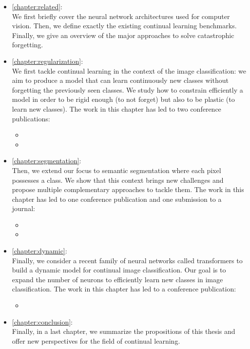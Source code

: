 \begin{itemize}
      \item \autoref{chapter:related}: \\
            We first briefly cover the neural network architectures used for computer vision. Then,
            we define exactly the existing continual learning benchmarks. Finally, we give an
            overview of the major approaches to solve catastrophic forgetting.

      \item \autoref{chapter:regularization}: \\
            We first tackle continual learning in the context of the image classification: we aim to
            produce a model that can learn continuously new classes without forgetting the
            previously seen classes. We study how to constrain efficiently a model in order to be
            rigid enough (to not forget) but also to be plastic (to learn new classes). The work in
            this chapter has led to two conference publications:
            \begin{itemize}
                  \item {}
                  \item {}
            \end{itemize}

      \item \autoref{chapter:segmentation}: \\
            Then, we extend our focus to semantic segmentation where each pixel possesses a class.
            We show that this context brings new challenges and propose multiple complementary
            approaches to tackle them. The work in this chapter has led to one conference publication and one
            submission to a journal:
            \begin{itemize}
                  \item {}
                  \item {}
            \end{itemize}

      \item \autoref{chapter:dynamic}: \\
            Finally, we consider a recent family of neural networks called transformers to build a
            dynamic model for continual image classification. Our goal is to expand the number of
            neurons to efficiently learn new classes in image classification. The work in this
            chapter has led to a conference publication:
            \begin{itemize}
                  \item {}
            \end{itemize}

      \item \autoref{chapter:conclusion}: \\
            Finally, in a last chapter, we summarize the propositions of this thesis and offer
            new perspectives for the field of continual learning.

\end{itemize}

